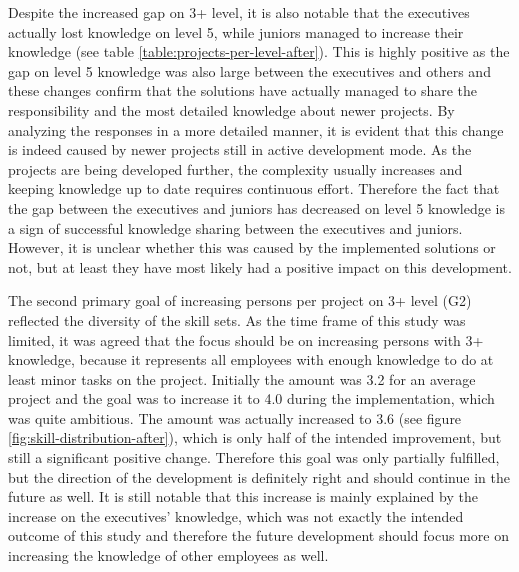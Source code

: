 Despite the increased gap on 3+ level, it is also notable that the executives actually lost knowledge on level 5, while juniors managed to increase their knowledge (see table \ref{table:projects-per-level-after}).
This is highly positive as the gap on level 5
knowledge was also large between the executives and others and these changes confirm that the solutions have actually managed to share the responsibility and the most detailed knowledge about newer projects.
By analyzing the responses in a more detailed manner, it is evident that this change is indeed caused by newer projects still in active development mode. As the projects are being developed further, the
complexity usually increases and keeping knowledge up to date requires continuous effort. Therefore the fact that the gap between the executives and juniors has decreased on level 5 knowledge is a sign
of successful knowledge sharing between the executives and juniors. However, it is unclear whether this was caused by the implemented solutions or not, but at least they have most likely had
a positive impact on this development.

The second primary goal of increasing persons per project on 3+ level (G2) reflected the diversity of the skill sets. As the time frame of this study was limited, it was agreed that the focus should be on
increasing persons with 3+ knowledge, because it represents all employees with enough knowledge to do at least minor tasks on the project. Initially the amount was 3.2 for an average project and the goal was
to increase it to 4.0 during the implementation, which was quite ambitious. The amount was actually increased to 3.6 (see figure \ref{fig:skill-distribution-after}), which is only half of the intended improvement, but still a significant positive
change. Therefore this goal was only partially fulfilled, but the direction of the development is definitely right and should continue in the future as well. It is still notable that this increase is mainly
explained by the increase on the executives' knowledge, which was not exactly the intended outcome of this study and therefore the future development should focus more on increasing the knowledge of other employees as
well.

